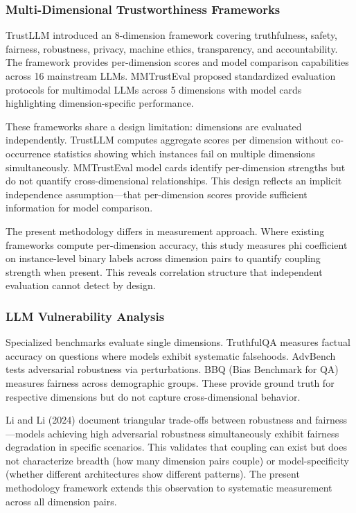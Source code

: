 
\subsubsection{Multi-Dimensional Trustworthiness Frameworks}

TrustLLM \citep{Sun2024} introduced an 8-dimension framework covering truthfulness, safety, fairness, robustness, privacy, machine ethics, transparency, and accountability. The framework provides per-dimension scores and model comparison capabilities across 16 mainstream LLMs. MMTrustEval proposed standardized evaluation protocols for multimodal LLMs across 5 dimensions with model cards highlighting dimension-specific performance.

These frameworks share a design limitation: dimensions are evaluated independently. TrustLLM computes aggregate scores per dimension without co-occurrence statistics showing which instances fail on multiple dimensions simultaneously. MMTrustEval model cards identify per-dimension strengths but do not quantify cross-dimensional relationships. This design reflects an implicit independence assumption---that per-dimension scores provide sufficient information for model comparison.

The present methodology differs in measurement approach. Where existing frameworks compute per-dimension accuracy, this study measures phi coefficient on instance-level binary labels across dimension pairs to quantify coupling strength when present. This reveals correlation structure that independent evaluation cannot detect by design.

\subsubsection{LLM Vulnerability Analysis}

Specialized benchmarks evaluate single dimensions. TruthfulQA measures factual accuracy on questions where models exhibit systematic falsehoods. AdvBench tests adversarial robustness via perturbations. BBQ (Bias Benchmark for QA) measures fairness across demographic groups. These provide ground truth for respective dimensions but do not capture cross-dimensional behavior.

Li and Li (2024) document triangular trade-offs between robustness and fairness---models achieving high adversarial robustness simultaneously exhibit fairness degradation in specific scenarios. This validates that coupling can exist but does not characterize breadth (how many dimension pairs couple) or model-specificity (whether different architectures show different patterns). The present methodology framework extends this observation to systematic measurement across all dimension pairs.

